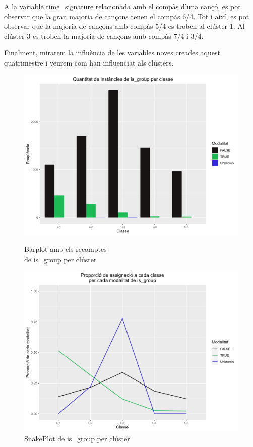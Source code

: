 A la variable time\_signature relacionada amb el compàs d'una cançó, es pot observar que la gran majoria de cançons tenen el compàs 6/4. Tot i així, es pot observar que la majoria de cançons amb compàs 5/4 es troben al clúster 1. Al clúster 3 es troben la majoria de cançons amb compàs 7/4 i 3/4.

Finalment, mirarem la influència de les variables noves creades aquest quatrimestre i veurem com han influenciat als clústers. 

\begin{figure}[H]
\centering
    \begin{minipage}{.49\textwidth}
        \centering
        \includegraphics[width=0.95\linewidth]{Images/5_Profiling/categoriques/cat/Cat_BarPlot_is_group.png}
        \caption{Barplot amb els recomptes \\ de is\_group per clúster}
        \label{fig:Cat_BarPlot_is_group}
    \end{minipage}%
    \begin{minipage}{.49\textwidth}
        \centering
        \includegraphics[width=0.95\linewidth]{Images/5_Profiling/categoriques/cat/Cat_SnakePlot_is_group.png}
        \caption{SnakePlot de is\_group per clúster}
        \label{fig:Cat_SnakePlot_is_group}
    \end{minipage}%
\end{figure}

